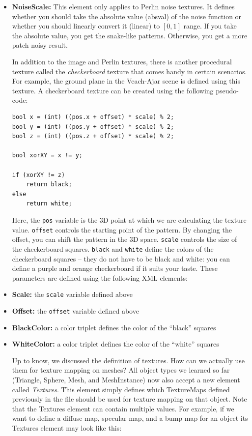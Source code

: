 \documentclass[12pt]{article}
\begin{document}
\begin{itemize}
\begin{itemize}
\item \textbf{NoiseScale:} This element only applies to Perlin noise
textures. It defines whether you should take the absolute value
(absval) of the noise function or whether you should linearly convert
it (linear) to $[0,1]$ range. If you take the absolute value, you get
the snake-like patterns. Otherwise, you get a more patch noisy result.

In addition to the image and Perlin textures, there is another procedural
texture called the \emph{checkerboard} texture that comes handy in
certain scenarios. For example, the ground plane in the Veach-Ajar
scene is defined using this texture. A checkerboard texture can be
created using the following pseudo-code:

\begin{verbatim}
bool x = (int) ((pos.x + offset) * scale) % 2; 
bool y = (int) ((pos.y + offset) * scale) % 2; 
bool z = (int) ((pos.z + offset) * scale) % 2;

bool xorXY = x != y;

if (xorXY != z) 
    return black; 
else 
    return white; 
\end{verbatim}

Here, the \texttt{pos} variable is the 3D point at which we are calculating the
texture value. \texttt{offset} controls the starting point of the
pattern. By changing the offset, you can shift the pattern in the 3D
space. \texttt{scale} controls the size of the checkerboard squares.
\texttt{black} and \texttt{white} define the colors of the checkerboard
squares -- they do not have to be black and white: you can define a
purple and orange checkerboard if it suits your taste. These parameters
are defined using the following XML elements:

\item \textbf{Scale:} the \texttt{scale} variable defined above
\item \textbf{Offset:} the \texttt{offset} variable defined above
\item \textbf{BlackColor:} a color triplet defines the color of the
``black'' squares
\item \textbf{WhiteColor:} a color triplet defines the color of the
``white'' squares

Up to know, we discussed the definition of textures. How can we
actually use them for texture mapping on meshes? All object types we
learned so far (Triangle, Sphere, Mesh, and MeshInstance) now also
accept a new element called \emph{Textures}. This element simply
defines which TextureMaps defined previously in the file should be
used for texture mapping on that object. Note that the Textures
element can contain multiple values. For example, if we want to define
a diffuse map, specular map, and a bump map for an object its
Textures element may look like this:


\end{itemize}
\end{itemize}
\end{document}
